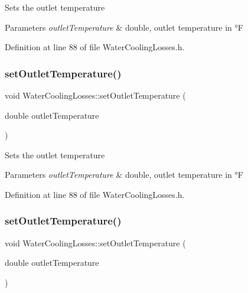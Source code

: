 Sets the outlet temperature 
\begin{DoxyParams}{Parameters}
{\em outlet\+Temperature} & double, outlet temperature in °F \\
\hline
\end{DoxyParams}


Definition at line 88 of file Water\+Cooling\+Losses.\+h.

\mbox{\label{class_water_cooling_losses_a36bb100df0580a78f63f266cdc1d41f5}} 
\subsubsection{\texorpdfstring{set\+Outlet\+Temperature()}{setOutletTemperature()}\hspace{0.1cm}{\footnotesize\ttfamily [2/3]}}
{\footnotesize\ttfamily void Water\+Cooling\+Losses\+::set\+Outlet\+Temperature (\begin{DoxyParamCaption}\item[{double}]{outlet\+Temperature }\end{DoxyParamCaption})\hspace{0.3cm}{\ttfamily [inline]}}

Sets the outlet temperature 
\begin{DoxyParams}{Parameters}
{\em outlet\+Temperature} & double, outlet temperature in °F \\
\hline
\end{DoxyParams}


Definition at line 88 of file Water\+Cooling\+Losses.\+h.

\mbox{\label{class_water_cooling_losses_a36bb100df0580a78f63f266cdc1d41f5}} 
\subsubsection{\texorpdfstring{set\+Outlet\+Temperature()}{setOutletTemperature()}\hspace{0.1cm}{\footnotesize\ttfamily [3/3]}}
{\footnotesize\ttfamily void Water\+Cooling\+Losses\+::set\+Outlet\+Temperature (\begin{DoxyParamCaption}\item[{double}]{outlet\+Temperature }\end{DoxyParamCaption})\hspace{0.3cm}{\ttfamily [inline]}}

